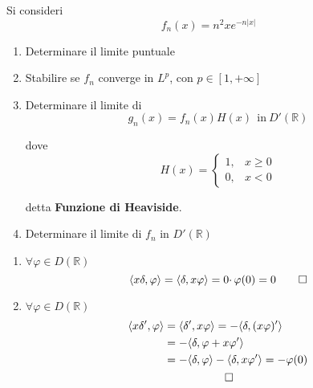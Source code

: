 Si consideri
\begin{equation*}
f_{n}( x) =n^{2} xe^{-n| x| }
\end{equation*}
\begin{enumerate}
\item Determinare il limite puntuale
\item Stabilire se $f_{n}$ converge in $L^{p}$, con $p\in [ 1,+\infty ]$
\item Determinare il limite di\begin{equation*}
g_{n}( x) =f_{n}( x) H( x) \ \ \text{in} \ D'(\mathbb{R})
\end{equation*}

dove\begin{equation*}
H( x) =\begin{cases}
1, & x\geqslant 0\\
0, & x< 0
\end{cases}
\end{equation*}

detta \textbf{Funzione di Heaviside}.
\item Determinare il limite di $f_{n}$ in $D'(\mathbb{R})$
\end{enumerate}
\ParteSoluzioni
\Soluzione
\begin{enumerate}
\item $\forall \varphi \in D(\mathbb{R})$\begin{equation*}
\langle x\delta ,\varphi \rangle =\langle \delta ,x\varphi \rangle =0\cdotp \varphi ( 0) =0\qed 
\end{equation*}
\item $\forall \varphi \in D(\mathbb{R})$\begin{gather*}
\begin{aligned}
\langle x\delta ',\varphi \rangle  & =\langle \delta ',x\varphi \rangle =-\langle \delta ,( x\varphi ) '\rangle \\
 & =-\langle \delta ,\varphi +x\varphi '\rangle \\
 & =-\langle \delta ,\varphi \rangle -\langle \delta ,x\varphi '\rangle =-\varphi ( 0)
\end{aligned}\\
\qed 
\end{gather*}
\end{enumerate}
\Soluzione

